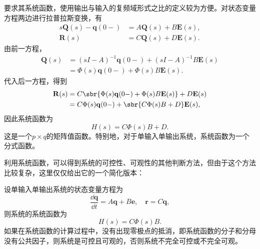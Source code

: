 要求其系统函数，使用输出与输入的复频域形式之比的定义较为方便。对状态变量方程两边进行拉普拉斯变换，有
\begin{align}
    s\mathbf{Q}(s)-\mathbf{q}(0-)&=A\mathbf{Q}(s)+B\mathbf{E}(s),\\
    \mathbf{R}(s)&=C\mathbf{Q}(s)+D\mathbf{E}(s).
\end{align}
由前一方程，
\begin{align}
    \mathbf{Q}(s)&=(sI-A)^{-1}\mathbf{q}(0-)+(sI-A)^{-1}B\mathbf{E}(s)\nonumber\\
    &=\Phi(s)\mathbf{q}(0-)+\Phi(s)B\mathbf{E}(s).
\end{align}
代入后一方程，得到
\begin{align}
    \mathbf{R}(s)&=C\sbr{\Phi(s)\mathbf{q}(0-)+\Phi(s)B\mathbf{E}(s)}+D\mathbf{E}(s)\nonumber\\
    &=C\Phi(s)\mathbf{q}(0-)+\sbr{C\Phi(s)B+D}\mathbf{E}(s),
\end{align}
因此系统函数为
\begin{equation}
    H(s)=C\Phi(s)B+D.
\end{equation}
这是一个$p\times q$的矩阵值函数。特别地，对于单输入单输出系统，系统函数为一个分式函数。

利用系统函数，可以得到系统的可控性、可观性的其他判断方法，但由于这个方法比较复杂，这里仅仅给出它的一个简化版本：
\begin{claim}
    设单输入单输出系统的状态变量方程为
    \begin{equation}
        \frac{\dd\mathbf{q}}{\dd t}=A\mathbf{q}+B\mathbf{e},\quad \mathbf{r}=C\mathbf{q},
    \end{equation}
    则系统的系统函数为
    \begin{equation}
        H(s)=C\Phi(s)B.
    \end{equation}
    如果在系统函数的计算过程中，没有出现零极点的抵消，即系统函数的分子和分母没有公共因子，则系统是可控且可观的，否则系统不完全可控或不完全可观。
\end{claim}
